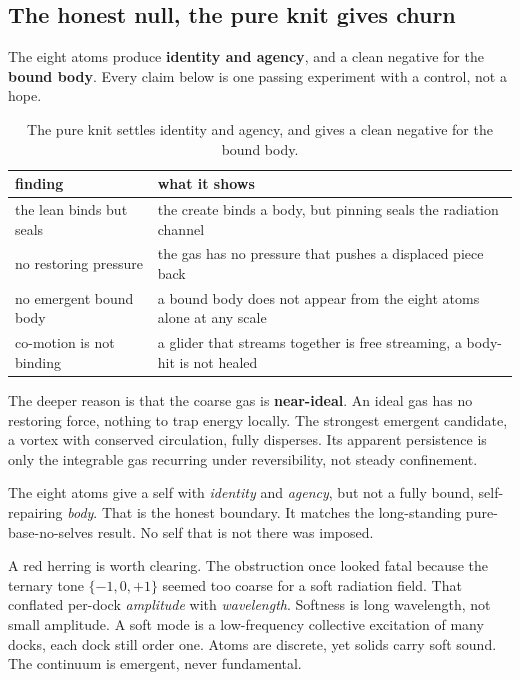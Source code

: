 \subsection{The honest null, the pure knit gives churn}

The eight atoms produce \textbf{identity and agency}, and a clean negative for the \textbf{bound body}. Every claim below is one passing experiment with a control, not a hope.

\begin{table}[ht]
\centering
\begin{tabular}{@{}ll@{}}
\toprule
finding & what it shows \\
\midrule
the lean binds but seals & the create binds a body, but pinning seals the radiation channel \\
no restoring pressure & the gas has no pressure that pushes a displaced piece back \\
no emergent bound body & a bound body does not appear from the eight atoms alone at any scale \\
co-motion is not binding & a glider that streams together is free streaming, a body-hit is not healed \\
\bottomrule
\end{tabular}
\caption{The pure knit settles identity and agency, and gives a clean negative for the bound body.}
\label{tab:null}
\end{table}

The deeper reason is that the coarse gas is \textbf{near-ideal}. An ideal gas has no restoring force, nothing to trap energy locally. The strongest emergent candidate, a vortex with conserved circulation, fully disperses. Its apparent persistence is only the integrable gas recurring under reversibility, not steady confinement.

\begin{result}
The eight atoms give a self with \emph{identity} and \emph{agency}, but not a fully bound, self-repairing \emph{body}. That is the honest boundary. It matches the long-standing pure-base-no-selves result. No self that is not there was imposed.
\end{result}

A red herring is worth clearing. The obstruction once looked fatal because the ternary tone $\{-1, 0, +1\}$ seemed too coarse for a soft radiation field. That conflated per-dock \emph{amplitude} with \emph{wavelength}. Softness is long wavelength, not small amplitude. A soft mode is a low-frequency collective excitation of many docks, each dock still order one. Atoms are discrete, yet solids carry soft sound. The continuum is emergent, never fundamental.

